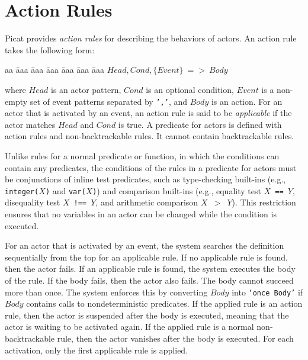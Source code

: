 \section{Action Rules}
Picat provides \emph{action rules} for describing the behaviors of actors. An action rule takes the following form:
\begin{tabbing}
aa \= aaa \= aaa \= aaa \= aaa \= aaa \= aaa \kill
\> $Head, Cond, \{Event\}\ $$=$$>$$\ Body$ 
\end{tabbing}
where $Head$ is an actor pattern, $Cond$ is an optional condition, $Event$ is a non-empty set of event patterns separated by \texttt{','}, and $Body$ is an action. For an actor that is activated by an event, an action rule is said to be \emph{applicable} if the actor matches $Head$ and $Cond$ is true. A predicate for actors is defined with action rules and non-backtrackable rules. It cannot contain backtrackable rules.

Unlike rules for a normal predicate or function, in which the conditions can contain any predicates, the conditions of the rules in a predicate for actors must be conjunctions of inline test predicates, such as type-checking built-ins (e.g., \texttt{integer($X$)} and \texttt{var($X$)}) and comparison built-ins (e.g., equality test \texttt{$X$ == $Y$}, disequality test {\tt $X$ \verb+!+== $Y$}, and arithmetic comparison \texttt{$X$ $>$ $Y$}). This restriction ensures that no variables in an actor can be changed while the condition is executed.

For an actor that is activated by an event, the system searches the definition sequentially from the top for an applicable rule. If no applicable rule is found, then the actor fails. If an applicable rule is found, the system executes the body of the rule. If the body fails, then the actor also fails. The body cannot succeed more than once. The system enforces this by converting \texttt{$Body$} into \texttt{`once $Body$'} if $Body$ contains calls to nondeterministic predicates. If the applied rule is an action rule, then the actor is suspended after the body is executed, meaning that the actor is waiting to be activated again. If the applied rule is a normal non-backtrackable rule, then the actor vanishes after the body is executed. For each activation, only the first applicable rule is applied.

